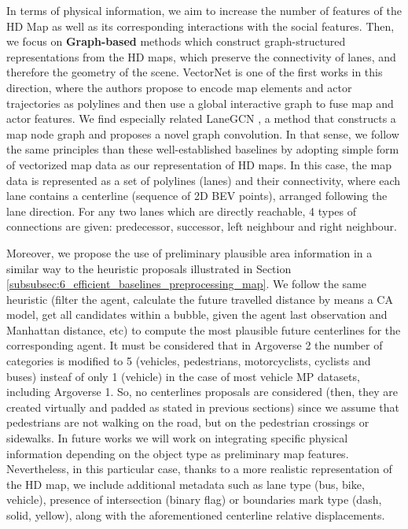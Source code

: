 In terms of physical information, we aim to increase the number of features of the HD Map as well as its corresponding interactions with the social features. Then, we focus on \textbf{Graph-based} methods \cite{zeng2021lanercnn} which construct graph-structured representations from the HD maps, which preserve the connectivity of lanes, and therefore the geometry of the scene. VectorNet \cite{gao2020vectornet} is one of the first works in this direction, where the authors propose to encode map elements and actor trajectories as polylines and then use a global interactive graph to fuse map and actor features. We find especially related LaneGCN \cite{liang2020learning}, a method that constructs a map node graph and proposes a novel graph convolution. In that sense, we follow the same principles than these well-established baselines by adopting simple form of vectorized map data as our representation of HD maps. In this case, the map data is represented as a set of polylines (lanes) and
their connectivity, where each lane contains a centerline (sequence of 2D \ac{BEV} points), arranged following the lane direction. For any two lanes which are directly reachable, 4 types of connections are given: predecessor, successor, left neighbour and right neighbour.

Moreover, we propose the use of preliminary plausible area information in a similar way to the heuristic proposals illustrated in Section \ref{subsubsec:6_efficient_baselines_preprocessing_map}. We follow the same heuristic (filter the agent, calculate the future travelled distance by means a CA model, get all candidates within a bubble, given the agent last observation and Manhattan distance, etc) to compute the most plausible future centerlines for the corresponding agent. It must be considered that in Argoverse 2 the number of categories is modified to 5 (vehicles, pedestrians, motorcyclists, cyclists and buses) insteaf of only 1 (vehicle) in the case of most vehicle \ac{MP} datasets, including Argoverse 1. So, no centerlines proposals are considered (then, they are created virtually and padded as stated in previous sections) since we assume that pedestrians are not walking on the road, but on the pedestrian crossings or sidewalks. In future works we will work on integrating specific physical information depending on the object type as preliminary map features. Nevertheless, in this particular case, thanks to a more realistic representation of the HD map, we include additional metadata such as lane type (bus, bike, vehicle), presence of intersection (binary flag) or boundaries mark type (dash, solid, yellow), along with the aforementioned centerline relative displacements. 

